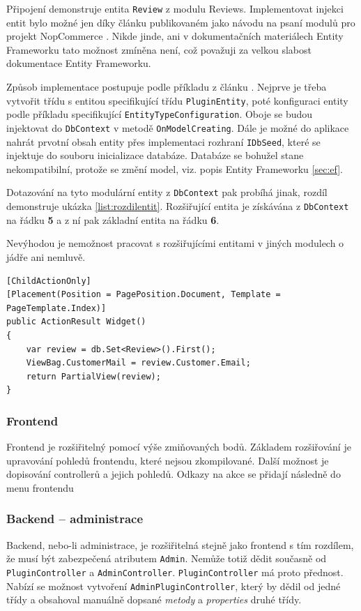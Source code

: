\documentclass[11pt,twoside,a4paper]{book}
\begin{document}
Připojení demonstruje entita \texttt{Review} z modulu \textsf{Reviews}. Implementovat injekci entit bylo možné jen díky článku publikovaném jako návodu na psaní modulů pro projekt NopCommerce \cite{NOPE}. Nikde jinde, ani v dokumentačních materiálech Entity Frameworku tato možnost zmíněna není, což považuji za velkou slabost dokumentace Entity Frameworku.

Způsob implementace postupuje podle příkladu z článku \cite{NOPE}. Nejprve je třeba vytvořit třídu s entitou specifikující třídu \texttt{PluginEntity}, poté konfiguraci entity podle příkladu specifikující \texttt{Entity\-Type\-Configuration}. Oboje se budou injektovat do \texttt{DbContext} v metodě \texttt{OnModel\-Creating}. Dále je možné do aplikace nahrát prvotní obsah entity přes implementaci rozhraní \texttt{IDbSeed}, které se injektuje do souboru inicializace databáze. Databáze se bohužel stane nekompatibilní, protože se změní model, viz. popis Entity Frameworku \ref{sec:ef}.

Dotazování na tyto modulární entity z \texttt{DbContext} pak probíhá jinak, rozdíl demonstruje ukázka \ref{list:rozdilentit}. Rozšiřující entita je získávána z \texttt{DbContext} na řádku \textbf{5} a z ní pak základní entita na řádku \textbf{6}. 

Nevýhodou je nemožnost pracovat s rozšiřujícími entitami v jiných modulech o jádře ani nemluvě.

\begin{lstlisting}[float=h!,language=CSharp, caption={rozdíl použití základní a rozšiřující entity}, label=list:rozdilentit]
[ChildActionOnly]
[Placement(Position = PagePosition.Document, Template = PageTemplate.Index)]
public ActionResult Widget()
{
    var review = db.Set<Review>().First();
    ViewBag.CustomerMail = review.Customer.Email;
    return PartialView(review);
}
\end{lstlisting}

\subsubsection{Frontend}

Frontend je rozšiřitelný pomocí výše zmiňovaných bodů. Základem rozšiřování je upravování pohledů frontendu, které nejsou zkompilované. Další možnost je dopisování controllerů a jejich pohledů. Odkazy na akce se přidají následně do menu frontendu

\subsubsection{Backend -- administrace}
\label{subsub:backend}
Backend, nebo-li administrace, je rozšiřitelná stejně jako frontend s tím rozdílem, že musí být zabezpečená atributem \texttt{Admin}. Nemůže totiž dědit současně od \texttt{PluginController} a \texttt{AdminController}. \texttt{PluginController} má proto přednost. Nabízí se možnost vytvoření \texttt{AdminPluginController}, který by dědil od jedné třídy a obsahoval manuálně dopsané \textit{metody} a \textit{properties} druhé třídy. 
\end{document}
